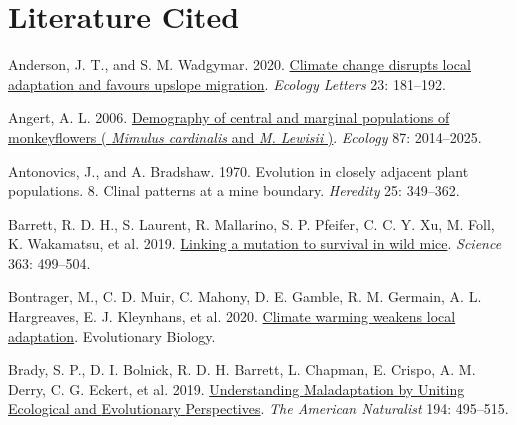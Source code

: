 \documentclass[
  12pt,
]{article}
\newlength{\cslhangindent}
\newlength{\cslentryspacingunit} %
\newenvironment{CSLReferences}[2] %
 {%
  \setlength{\parindent}{0pt}
  \ifodd #1
  \let\oldpar\par
  \def\par{\hangindent=\cslhangindent\oldpar}
  \fi
  \setlength{\parskip}{#2\cslentryspacingunit}
 }%
 {}
\begin{document}
\begin{table}
  \captionsetup{labelformat=empty}
  \caption{}
  \label{tab:df_ind_lm}
\end{table}

\clearpage

\hypertarget{literature-cited}{%
\section*{Literature Cited}\label{literature-cited}}

\hypertarget{refs}{}
\begin{CSLReferences}{1}{0}
\leavevmode{}%
Anderson, J. T., and S. M. Wadgymar. 2020. \href{https://doi.org/10.1111/ele.13427}{Climate change disrupts local adaptation and favours upslope migration}. \emph{Ecology Letters} 23: 181--192.

\leavevmode{}%
Angert, A. L. 2006. \href{https://doi.org/10.1890/0012-9658(2006)87\%5B2014:DOCAMP\%5D2.0.CO;2}{Demography of central and marginal populations of monkeyflowers ( \emph{{Mimulus} cardinalis} and \emph{{M}. Lewisii} )}. \emph{Ecology} 87: 2014--2025.

\leavevmode{}%
Antonovics, J., and A. Bradshaw. 1970. Evolution in closely adjacent plant populations. 8. {Clinal} patterns at a mine boundary. \emph{Heredity} 25: 349--362.

\leavevmode{}%
Barrett, R. D. H., S. Laurent, R. Mallarino, S. P. Pfeifer, C. C. Y. Xu, M. Foll, K. Wakamatsu, et al. 2019. \href{https://doi.org/10.1126/science.aav3824}{Linking a mutation to survival in wild mice}. \emph{Science} 363: 499--504.

\leavevmode{}%
Bontrager, M., C. D. Muir, C. Mahony, D. E. Gamble, R. M. Germain, A. L. Hargreaves, E. J. Kleynhans, et al. 2020. \href{https://doi.org/10.1101/2020.11.01.364349}{Climate warming weakens local adaptation}. Evolutionary Biology.

\leavevmode{}%
Brady, S. P., D. I. Bolnick, R. D. H. Barrett, L. Chapman, E. Crispo, A. M. Derry, C. G. Eckert, et al. 2019. \href{https://doi.org/10.1086/705020}{Understanding {Maladaptation} by {Uniting} {Ecological} and {Evolutionary} {Perspectives}}. \emph{The American Naturalist} 194: 495--515.


\end{CSLReferences}
\end{document}
